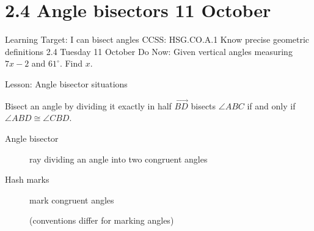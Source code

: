 \section{2.4 Angle bisectors \hfill 11 October}
\begin{frame}{Learning Target: I can bisect angles}
  {CCSS: HSG.CO.A.1 Know precise geometric definitions  \hfill \alert{2.4 Tuesday 11 October}}
  Do Now: Given vertical angles measuring $7x-2$ and $61^\circ$. Find $x$. \par \bigskip
   \par \vspace{1cm}
  Lesson: Angle bisector situations
  \end{frame}

\begin{frame}{Bisect an angle by dividing it exactly in half}
    $\overrightarrow{BD}$ bisects $\angle ABC$ if and only if $\angle ABD \cong \angle CBD$. \par \bigskip
    \begin{center}
      \end{center}
      \begin{description}
        \item[Angle bisector] ray dividing an angle into two congruent angles
        \item[Hash marks] mark congruent angles \par (conventions differ for marking angles)
      \end{description}
    \end{frame}

